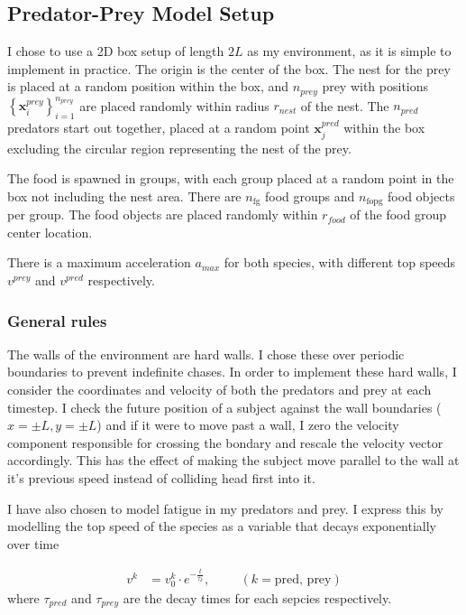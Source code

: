 \documentclass[%
11pt,
amsmath, amssymb,
aps,
pra
]{revtex4-2}
\begin{document}
\subsection{Predator-Prey Model Setup}
I chose to use a 2D box setup of length \(2L\) as my environment, as it is simple to implement in practice.
The origin is the center of the box.
The nest for the prey is placed at a random position within the box, and \(n_{prey}\) prey with positions \(\left\{\mathbf{x}_i^{prey}\right\}_{i=1}^{n_{prey}}\)
are placed randomly within radius \(r_{nest}\) of the nest. The \(n_{pred}\) predators start out together, 
placed at a random point \(\mathbf{x}_j^{pred}\) within the box
excluding the circular region representing the nest of the prey.

The food is spawned in groups, with each group placed at a random point in the box not including the nest area. There are
\(n_{\text{fg}}\) food groups and \(n_{\text{fopg}}\) food objects per group. The food objects are placed randomly within
\(r_{food}\) of the food group center location.

There is a maximum acceleration \(a_{max}\) for both species, with different top speeds \(v^{prey}\) and 
\(v^{pred}\) respectively.

\subsubsection{General rules}
The walls of the environment are hard walls. I chose these over periodic boundaries to prevent indefinite chases.
In order to implement these hard walls, I consider the coordinates and velocity of both the predators and prey at each timestep.
I check the future position of a subject against the wall boundaries (\(x=\pm L,y=\pm L\)) and if it
 were to move past a wall, I zero the velocity component responsible for crossing the bondary and rescale
the velocity vector accordingly. This has the effect of making the subject move parallel to the wall at it's previous speed
instead of colliding head first into it.

I have also chosen to model fatigue in my predators and prey. I express this by modelling the top speed of the species
as a variable that decays exponentially over time

\begin{align}
    v^k &= v_0^k \cdot e^{-\frac{t}{\tau_k}}, \hspace{1cm} (k= \text{pred, prey})
\end{align}
where \(\tau_{pred}\) and \(\tau_{prey}\) are the decay times for each sepcies respectively.
\end{document}
